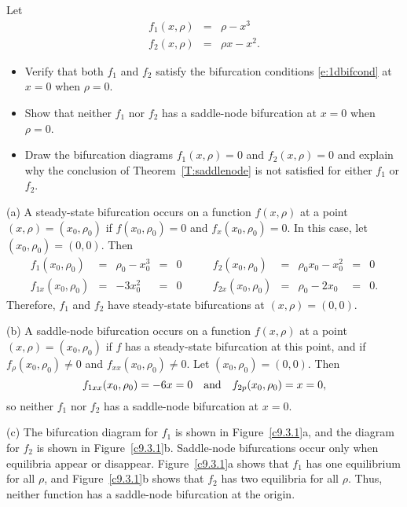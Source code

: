 \documentclass{ximera}
\begin{document}
\begin{exercise} \label{c9.3.1}
Let 
\begin{eqnarray*}
f_1(x,\rho) & = & \rho - x^3 \\
f_2(x,\rho) & = & \rho x - x^2.
\end{eqnarray*}
\begin{itemize}
\item[(a)] Verify that both $f_1$ and $f_2$ satisfy the bifurcation conditions 
\eqref{e:1dbifcond} at $x=0$ when $\rho=0$.
\item[(b)] Show that neither $f_1$ nor $f_2$ has a saddle-node bifurcation
at $x=0$ when $\rho=0$. 
\item[(c)] Draw the bifurcation diagrams $f_1(x,\rho)=0$ and 
$f_2(x,\rho)=0$ and explain why the conclusion of 
Theorem~\ref{T:saddlenode} is not satisfied for either $f_1$ 
or $f_2$.
\end{itemize}

\begin{solution}

(a) A steady-state bifurcation occurs on a function $f(x,\rho)$ at a
point $(x,\rho) = (x_0,\rho_0)$ if $f(x_0,\rho_0) = 0$ and
$f_x(x_0,\rho_0) = 0$.  In this case, let $(x_0,\rho_0) = (0,0)$.
Then
\[ \begin{array}{rcccl}
f_1(x_0,\rho_0) & = & \rho_0 - x_0^3 & = & 0 \\
f_{1x}(x_0,\rho_0) & = & -3x_0^2 & = & 0 \end{array}
\qquad
\begin{array}{rcccl}
f_2(x_0,\rho_0) & = & \rho_0x_0 - x_0^2 & = & 0 \\
f_{2x}(x_0,\rho_0) & = & \rho_0 - 2x_0 & = & 0. \end{array}
\]
Therefore, $f_1$ and $f_2$ have steady-state bifurcations at $(x,\rho)
= (0,0)$.

(b) A saddle-node bifurcation occurs on a function $f(x,\rho)$ at a point
$(x,\rho) = (x_0,\rho_0)$ if $f$ has a steady-state bifurcation at this
point, and if $f_\rho(x_0,\rho_0) \neq 0$ and $f_{xx}(x_0,\rho_0) \neq 0$.
Let $(x_0,\rho_0) = (0,0)$.  Then
\[
f_{1xx}(x_0,\rho_0) = -6x = 0 \quad\mbox{and}\quad
f_{2p}(x_0,\rho_0) = x = 0,
\]
so neither $f_1$ nor $f_2$ has a saddle-node bifurcation at $x = 0$.

(c) The bifurcation diagram for $f_1$ is shown in Figure~\ref{c9.3.1}a, and
the diagram for $f_2$ is shown in Figure~\ref{c9.3.1}b.  Saddle-node
bifurcations occur only when equilibria appear or disappear.
Figure~\ref{c9.3.1}a shows that $f_1$ has one equilibrium for all $\rho$,
and Figure~\ref{c9.3.1}b shows that $f_2$ has two equilibria for all
$\rho$.  Thus, neither function has a saddle-node bifurcation at the origin.


\begin{figure}[htb]
                       \centerline{%
                       }
\end{figure}

\end{solution}
\end{exercise}
\end{document}

